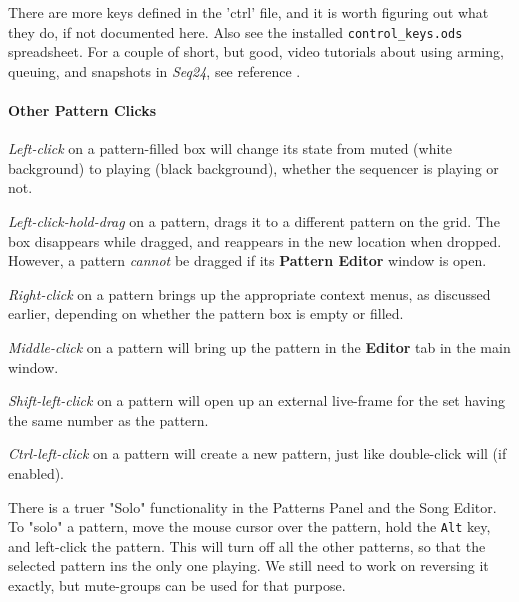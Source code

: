    There are more keys defined in the 'ctrl' file, and it is
   worth figuring out what they do, if not documented here.
   Also see the installed \texttt{control\_keys.ods} spreadsheet.
   For a couple of short, but good, video tutorials about using arming,
   queuing, and snapshots in \textsl{Seq24}, see reference \cite{wootangent1}.

\paragraph{Other Pattern Clicks}
\label{paragraph:patterns_pattern_clicks}

   \textsl{Left-click} on a pattern-filled box will change its state
   from muted (white background) to playing (black background), whether
   the sequencer is playing or not.

   \textsl{Left-click-hold-drag} on a pattern, drags it to a different
   pattern on the grid.
   The box disappears while dragged, and reappears in the new location when
   dropped.  However, a pattern \textsl{cannot} be dragged if its
   \textbf{Pattern Editor} window is open.

   \textsl{Right-click} on a pattern brings up the appropriate context menus, as
   discussed earlier, depending on whether the pattern box is empty or
   filled.

   \textsl{Middle-click} on a pattern will bring up the pattern
   in the \textbf{Editor}
   tab in the main window.

   \textsl{Shift-left-click} on a pattern will open up an external
   live-frame for the
   set having the same number as the pattern.

   \textsl{Ctrl-left-click} on a pattern will create a new pattern, just like
   double-click will (if enabled).

   There is a truer "Solo" functionality in the Patterns
   Panel and the Song Editor.  To "solo" a pattern, move the mouse cursor
   over the pattern, hold the \texttt{Alt} key, and left-click the pattern.
   This will turn off all the other patterns, so that the selected pattern ins
   the only one playing.
   We still need to work on reversing it exactly, but
   mute-groups can be used for that purpose.

